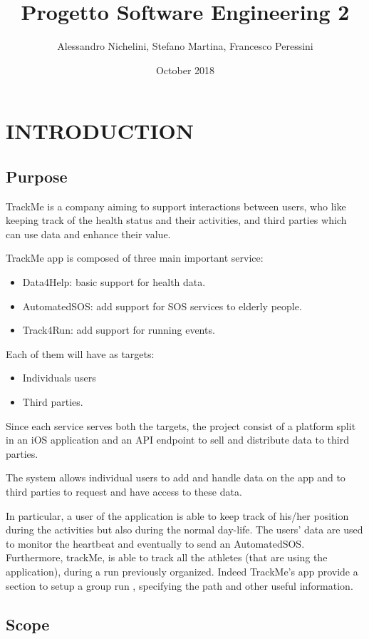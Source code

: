 \documentclass{article}
\title{Progetto Software Engineering 2}
\author{Alessandro Nichelini, Stefano Martina, Francesco Peressini}
\date{October 2018}
\begin{document}
\maketitle

\section{INTRODUCTION}

\subsection{Purpose}

TrackMe is a company aiming to support interactions between users, who like keeping track of the health status and their activities, and third parties which can use data and enhance their value.

TrackMe app is composed of three main important service:
\begin{itemize}
\item Data4Help: basic support for health data.
\item AutomatedSOS: add support for SOS services to elderly people. 
\item Track4Run: add support for running events.
\end{itemize}

Each of them will have as targets:
\begin{itemize}
\item Individuals users
\item Third parties.
\end{itemize}
Since each service serves both the targets, the project consist of a platform split in an iOS application and an API endpoint to sell and distribute data to third parties.

The system allows individual users to add and handle data on the app and to third parties to request and have access to these data.

In particular, a user of the application is able to keep track of his/her position during the activities but also during the normal day-life. The users’ data are used to monitor the heartbeat and eventually to send an AutomatedSOS.
Furthermore, trackMe, is able to track all the athletes (that are using the application), during a run previously organized. Indeed TrackMe’s app provide a section to setup a group run , specifying the path and other useful information.

\subsection{Scope}
\end{document}
